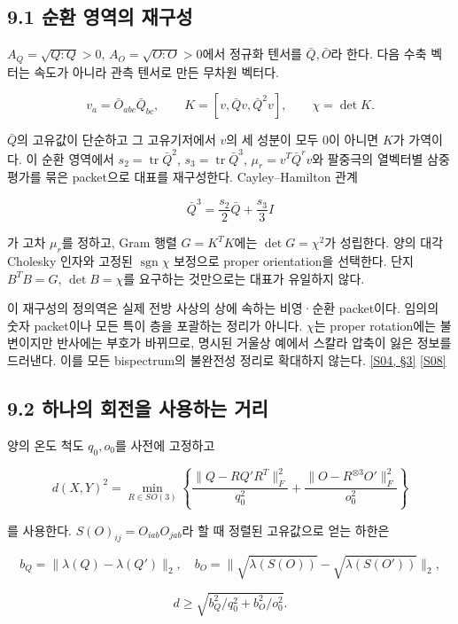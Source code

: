 \documentclass[11pt,a4paper]{article}
\begin{document}

\subsection*{9.1 순환 영역의 재구성}

\(A_Q=\sqrt{Q:Q}>0\), \(A_O=\sqrt{O:O}>0\)에서 정규화 텐서를 \(\bar Q,\bar O\)라 한다. 다음 수축 벡터는 속도가 아니라 관측 텐서로 만든 무차원 벡터다.


\[
v_a=\bar O_{abc}\bar Q_{bc},\qquad
K=[v,\bar Qv,\bar Q^2v],\qquad \chi=\det K.
\]

\(\bar Q\)의 고유값이 단순하고 그 고유기저에서 \(v\)의 세 성분이 모두 0이 아니면 \(K\)가 가역이다. 이 순환 영역에서 \(s_2=\operatorname{tr}\bar Q^2\), \(s_3=\operatorname{tr}\bar Q^3\), \(\mu_r=v^T\bar Q^rv\)와 팔중극의 열벡터별 삼중 평가를 묶은 packet으로 대표를 재구성한다. Cayley–Hamilton 관계


\[
\bar Q^3=\frac{s_2}{2}\bar Q+\frac{s_3}{3}I
\]

가 고차 \(\mu_r\)를 정하고, Gram 행렬 \(G=K^TK\)에는 \(\det G=\chi^2\)가 성립한다. 양의 대각 Cholesky 인자와 고정된 \(\operatorname{sgn}\chi\) 보정으로 proper orientation을 선택한다. 단지 \(B^TB=G\), \(\det B=\chi\)를 요구하는 것만으로는 대표가 유일하지 않다.


이 재구성의 정의역은 실제 전방 사상의 상에 속하는 비영·순환 packet이다. 임의의 숫자 packet이나 모든 특이 층을 포괄하는 정리가 아니다. \(\chi\)는 proper rotation에는 불변이지만 반사에는 부호가 바뀌므로, 명시된 거울상 예에서 스칼라 압축이 잃은 정보를 드러낸다. 이를 모든 bispectrum의 불완전성 정리로 확대하지 않는다. \hyperlink{src:S04}{[S04, §3]} \hyperlink{src:S08}{[S08]}


\subsection*{9.2 하나의 회전을 사용하는 거리}

양의 온도 척도 \(q_0,o_0\)를 사전에 고정하고


\[
d(X,Y)^2=\min_{R\in SO(3)}
\left\{\frac{\|Q-RQ'R^T\|_F^2}{q_0^2}
+\frac{\|O-R^{\otimes3}O'\|_F^2}{o_0^2}\right\}
\]

를 사용한다. \(S(O)_{ij}=O_{iab}O_{jab}\)라 할 때 정렬된 고유값으로 얻는 하한은


\[
b_Q=\|\lambda(Q)-\lambda(Q')\|_2,\quad
b_O=\|\sqrt{\lambda(S(O))}-\sqrt{\lambda(S(O'))}\|_2,
\]

\[
d\ge\sqrt{b_Q^2/q_0^2+b_O^2/o_0^2}.
\]
\end{document}
